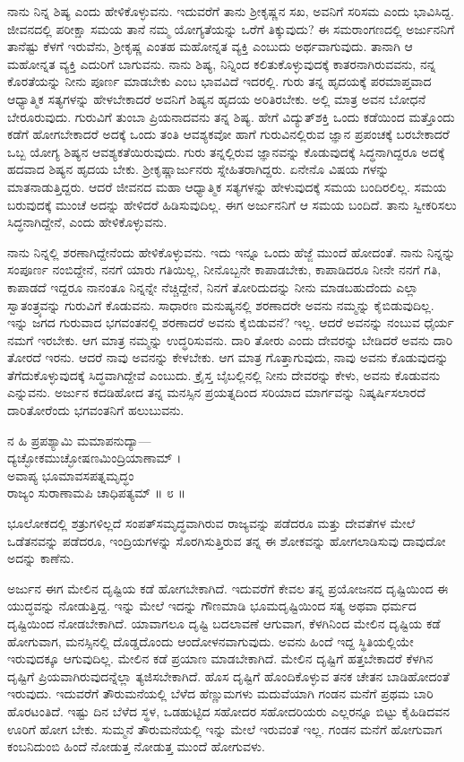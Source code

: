 ನಾನು ನಿನ್ನ ಶಿಷ್ಯ ಎಂದು ಹೇಳಿಕೊಳ್ಳುವನು. ಇದುವರೆಗೆ ತಾನು ಶ್ರೀಕೃಷ್ಣನ ಸಖ, ಅವನಿಗೆ ಸರಿಸಮ ಎಂದು ಭಾವಿಸಿದ್ದ. ಜೀವನದಲ್ಲಿ ಪರೀಕ್ಷಾ ಸಮಯ ತಾನೆ ನಮ್ಮ ಯೋಗ್ಯತೆಯನ್ನು ಒರೆಗೆ ತಿಕ್ಕುವುದು? ಈ ಸಮರಾಂಗಣದಲ್ಲಿ ಅರ್ಜುನನಿಗೆ ತಾನೆಷ್ಟು ಕೆಳಗೆ ಇರುವೆನು, ಶ್ರೀಕೃಷ್ಣ ಎಂತಹ ಮಹೋನ್ನತ ವ್ಯಕ್ತಿ ಎಂಬುದು ಅರ್ಥವಾಗುವುದು. ತಾನಾಗಿ ಆ ಮಹೋನ್ನತ ವ್ಯಕ್ತಿ ಎದುರಿಗೆ ಬಾಗುವನು. ನಾನು ಶಿಷ್ಯ, ನಿನ್ನಿಂದ ಕಲಿತುಕೊಳ್ಳುವುದಕ್ಕೆ ಕಾತರನಾಗಿರುವವನು, ನನ್ನ ಕೊರತೆಯನ್ನು ನೀನು ಪೂರ್ಣ ಮಾಡಬೇಕು ಎಂಬ ಭಾವವಿದೆ ಇದರಲ್ಲಿ. ಗುರು ತನ್ನ ಹೃದಯಕ್ಕೆ ಪರಮಾಪ್ತವಾದ ಆಧ್ಯಾತ್ಮಿಕ ಸತ್ಯಗಳನ್ನು ಹೇಳಬೇಕಾದರೆ ಅವನಿಗೆ ಶಿಷ್ಯನ ಹೃದಯ ಅರಿತಿರಬೇಕು. ಅಲ್ಲಿ ಮಾತ್ರ ಅವನ ಬೋಧನೆ ಬೇರೂರುವುದು. ಗುರುವಿಗೆ ತುಂಬಾ ಪ್ರಿಯನಾದವನು ತನ್ನ ಶಿಷ್ಯ. ಹೇಗೆ ವಿದ್ಯುತ್​ಶಕ್ತಿ ಒಂದು ಕಡೆಯಿಂದ ಮತ್ತೊಂದು ಕಡೆಗೆ ಹೋಗಬೇಕಾದರೆ ಅದಕ್ಕೆ ಒಂದು ತಂತಿ ಆವಶ್ಯಕವೋ ಹಾಗೆ ಗುರುವಿನಲ್ಲಿರುವ ಜ್ಞಾನ ಪ್ರಪಂಚಕ್ಕೆ ಬರಬೇಕಾದರೆ ಒಬ್ಬ ಯೋಗ್ಯ ಶಿಷ್ಯನ ಆವಶ್ಯಕತೆಯಿರುವುದು. ಗುರು ತನ್ನಲ್ಲಿರುವ ಜ್ಞಾನವನ್ನು ಕೊಡುವುದಕ್ಕೆ ಸಿದ್ಧನಾಗಿದ್ದರೂ ಅದಕ್ಕೆ ಹದವಾದ ಶಿಷ್ಯನ ಹೃದಯ ಬೇಕು. ಶ್ರೀಕೃಷ್ಣಾರ್ಜುನರು ಸ್ನೇಹಿತರಾಗಿದ್ದರು. ಏನೇನೊ ವಿಷಯ ಗಳನ್ನು ಮಾತನಾಡುತ್ತಿದ್ದರು. ಆದರೆ ಜೀವನದ ಮಹಾ ಆಧ್ಯಾತ್ಮಿಕ ಸತ್ಯಗಳನ್ನು ಹೇಳುವುದಕ್ಕೆ ಸಮಯ ಬಂದಿರಲಿಲ್ಲ. ಸಮಯ ಬರುವುದಕ್ಕೆ ಮುಂಚೆ ಅದನ್ನು ಹೇಳಿದರೆ ಹಿಡಿಸುವುದಿಲ್ಲ. ಈಗ ಅರ್ಜುನನಿಗೆ ಆ ಸಮಯ ಬಂದಿದೆ. ತಾನು ಸ್ವೀಕರಿಸಲು ಸಿದ್ಧನಾಗಿದ್ದೇನೆ, ಎಂದು ಹೇಳಿಕೊಳ್ಳುವನು.

ನಾನು ನಿನ್ನಲ್ಲಿ ಶರಣಾಗಿದ್ದೇನೆಂದು ಹೇಳಿಕೊಳ್ಳುವನು. ಇದು ಇನ್ನೂ ಒಂದು ಹೆಜ್ಜೆ ಮುಂದೆ ಹೋದಂತೆ. ನಾನು ನಿನ್ನನ್ನು ಸಂಪೂರ್ಣ ನಂಬಿದ್ದೇನೆ, ನನಗೆ ಯಾರು ಗತಿಯಿಲ್ಲ, ನೀನೊಬ್ಬನೇ ಕಾಪಾಡಬೇಕು, ಕಾಪಾಡಿದರೂ ನೀನೇ ನನಗೆ ಗತಿ, ಕಾಪಾಡದೆ ಇದ್ದರೂ ನಾನಂತೂ ನಿನ್ನನ್ನೇ ನೆಚ್ಚಿದ್ದೇನೆ, ನಿನಗೆ ತೋರಿದುದನ್ನು ನೀನು ಮಾಡಬಹುದೆಂದು ಎಲ್ಲಾ ಸ್ವಾತಂತ್ರ್ಯವನ್ನು ಗುರುವಿಗೆ ಕೊಡುವನು. ಸಾಧಾರಣ ಮನುಷ್ಯನಲ್ಲಿ ಶರಣಾದರೇ ಅವನು ನಮ್ಮನ್ನು ಕೈಬಿಡುವುದಿಲ್ಲ. ಇನ್ನು ಜಗದ ಗುರುವಾದ ಭಗವಂತನಲ್ಲಿ ಶರಣಾದರೆ ಅವನು ಕೈಬಿಡುವನೆ? ಇಲ್ಲ. ಆದರೆ ಅವನನ್ನು ನಂಬುವ ಧೈರ್ಯ ನಮಗೆ ಇರಬೇಕು. ಆಗ ಮಾತ್ರ ನಮ್ಮನ್ನು ಉದ್ಧರಿಸುವನು. ದಾರಿ ತೋರು ಎಂದು ದೇವರನ್ನು ಬೇಡಿದರೆ ಅವನು ದಾರಿ ತೋರದೆ ಇರನು. ಆದರೆ ನಾವು ಅವನನ್ನು ಕೇಳಬೇಕು. ಆಗ ಮಾತ್ರ ಗೊತ್ತಾಗುವುದು, ನಾವು ಅವನು ಕೊಡುವುದನ್ನು ತೆಗೆದುಕೊಳ್ಳುವುದಕ್ಕೆ ಸಿದ್ಧವಾಗಿದ್ದೇವೆ ಎಂಬುದು. ಕ್ರೈಸ್ತ ಬೈಬಲ್ಲಿನಲ್ಲಿ ನೀನು ದೇವರನ್ನು ಕೇಳು, ಅವನು ಕೊಡುವನು ಎನ್ನುವನು. ಅರ್ಜುನ ಕದಡಿಹೋದ ತನ್ನ ಮನಸ್ಸಿನ ಪ್ರಯತ್ನದಿಂದ ಸರಿಯಾದ ಮಾರ್ಗವನ್ನು ನಿಷ್ಕರ್ಷಿಸಲಾರದೆ ದಾರಿತೋರೆಂದು ಭಗವಂತನಿಗೆ ಹಲುಬುವನು.

ನ ಹಿ ಪ್ರಪಶ್ಯಾಮಿ ಮಮಾಪನುದ್ಯಾ—\\ದ್ಯಚ್ಛೋಕಮುಚ್ಛೋಷಣಮಿಂದ್ರಿಯಾಣಾಮ್ ।\\ಅವಾಪ್ಯ ಭೂಮಾವಸಪತ್ನಮೃದ್ಧಂ \\ರಾಜ್ಯಂ ಸುರಾಣಾಮಪಿ ಚಾಧಿಪತ್ಯಮ್ \num{॥ ೮ ॥}

{\small ಭೂಲೋಕದಲ್ಲಿ ಶತ್ರುಗಳಿಲ್ಲದೆ ಸಂಪತ್​ಸಮೃದ್ಧವಾಗಿರುವ ರಾಜ್ಯವನ್ನು ಪಡೆದರೂ ಮತ್ತು ದೇವತೆಗಳ ಮೇಲೆ ಒಡೆತನವನ್ನು ಪಡೆದರೂ, ಇಂದ್ರಿಯಗಳನ್ನು ಸೊರಗಿಸುತ್ತಿರುವ ತನ್ನ ಈ ಶೋಕವನ್ನು ಹೋಗಲಾಡಿಸುವು ದಾವುದೋ ಅದನ್ನು ಕಾಣೆನು.}

ಅರ್ಜುನ ಈಗ ಮೇಲಿನ ದೃಷ್ಟಿಯ ಕಡೆ ಹೋಗಬೇಕಾಗಿದೆ. ಇದುವರೆಗೆ ಕೇವಲ ತನ್ನ ಪ್ರಯೋಜನದ ದೃಷ್ಟಿಯಿಂದ ಈ ಯುದ್ಧವನ್ನು ನೋಡುತ್ತಿದ್ದ. ಇನ್ನು ಮೇಲೆ ಇದನ್ನು ಗೌಣಮಾಡಿ ಭೂಮದೃಷ್ಟಿಯಿಂದ ಸತ್ಯ ಅಥವಾ ಧರ್ಮದ ದೃಷ್ಟಿಯಿಂದ ನೋಡಬೇಕಾಗಿದೆ. ಯಾವಾಗಲೂ ದೃಷ್ಟಿ ಬದಲಾವಣೆ ಆಗುವಾಗ, ಕೆಳಗಿನಿಂದ ಮೇಲಿನ ದೃಷ್ಟಿಯ ಕಡೆ ಹೋಗುವಾಗ, ಮನಸ್ಸಿನಲ್ಲಿ ದೊಡ್ಡದೊಂದು ಆಂದೋಳನವಾಗುವುದು. ಅವನು ಹಿಂದೆ ಇದ್ದ ಸ್ಥಿತಿಯಲ್ಲಿಯೇ ಇರುವುದಕ್ಕೂ ಆಗುವುದಿಲ್ಲ. ಮೇಲಿನ ಕಡೆ ಪ್ರಯಾಣ ಮಾಡಬೇಕಾಗಿದೆ. ಮೇಲಿನ ದೃಷ್ಟಿಗೆ ಹತ್ತಬೇಕಾದರೆ ಕೆಳಗಿನ ದೃಷ್ಟಿಗೆ ಪ್ರಿಯವಾಗಿರುವುದನ್ನೆಲ್ಲಾ ತ್ಯಜಿಸಬೇಕಾಗಿದೆ. ಹೊಸ ದೃಷ್ಟಿಗೆ ಹೊಂದಿಕೊಳ್ಳುವ ತನಕ ಚೇತನ ಬಾಡಿಹೋದಂತೆ ಇರುವುದು. ಇದುವರೆಗೆ ತೌರುಮನೆಯಲ್ಲಿ ಬೆಳೆದ ಹೆಣ್ಣುಮಗಳು ಮದುವೆಯಾಗಿ ಗಂಡನ ಮನೆಗೆ ಪ್ರಥಮ ಬಾರಿ ಹೊರಟಂತಿದೆ. ಇಷ್ಟು ದಿನ ಬೆಳೆದ ಸ್ಥಳ, ಒಡಹುಟ್ಟಿದ ಸಹೋದರ ಸಹೋದರಿಯರು ಎಲ್ಲರನ್ನೂ ಬಿಟ್ಟು ಕೈಹಿಡಿದವನ ಊರಿಗೆ ಹೋಗ ಬೇಕು. ಸುಮ್ಮನೆ ತೌರುಮನೆಯಲ್ಲಿ ಇನ್ನು ಮೇಲೆ ಇರುವಂತೆ ಇಲ್ಲ. ಗಂಡನ ಮನೆಗೆ ಹೋಗುವಾಗ ಕಂಬನಿದುಂಬಿ ಹಿಂದೆ ನೋಡುತ್ತ ನೋಡುತ್ತ ಮುಂದೆ ಹೋಗುವಳು.

